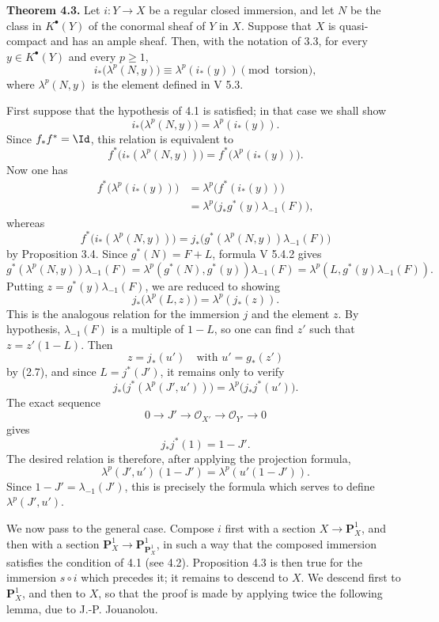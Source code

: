 \documentclass[11pt]{article}
\begin{document}
\textbf{Theorem 4.3.} Let \(i:Y\to X\) be a regular closed immersion, and let \(N\) be the class in \(K^\bullet(Y)\) of the conormal sheaf of \(Y\) in \(X\). Suppose that \(X\) is quasi-compact and has an ample sheaf. Then, with the notation of 3.3, for every \(y\in K^\bullet(Y)\) and every \(p\ge1\),
\begin{equation}\tag{4.3.1}
 i_*\bigl(\lambda^p(N,y)\bigr)\equiv \lambda^p(i_*(y))
 \pmod{\text{torsion}},
\end{equation}
where \(\lambda^p(N,y)\) is the element defined in V 5.3.

First suppose that the hypothesis of 4.1 is satisfied; in that case we shall show
\[
  i_*\bigl(\lambda^p(N,y)\bigr)=\lambda^p(i_*(y)).
\]
Since \(f_*f^*=\Id\), this relation is equivalent to
\[
  f^*\bigl(i_*(\lambda^p(N,y))\bigr)=
  f^*\bigl(\lambda^p(i_*(y))\bigr).
\]
Now one has
\[
\begin{aligned}
 f^*\bigl(\lambda^p(i_*(y))\bigr)
 &=\lambda^p\bigl(f^*(i_*(y))\bigr)\\
 &=\lambda^p\bigl(j_*g^*(y)\lambda_{-1}(F)\bigr),
\end{aligned}
\tag{3.4}
\]
whereas
\[
  f^*\bigl(i_*(\lambda^p(N,y))\bigr)
  =
  j_*\bigl(g^*(\lambda^p(N,y))\lambda_{-1}(F)\bigr)
  \tag{3.4}
\]
by Proposition 3.4. Since \(g^*(N)=F+L\), formula V 5.4.2 gives
\[
  g^*(\lambda^p(N,y))\lambda_{-1}(F)
  =
  \lambda^p(g^*(N),g^*(y))\lambda_{-1}(F)
  =
  \lambda^p(L,g^*(y)\lambda_{-1}(F)).
\]
Putting \(z=g^*(y)\lambda_{-1}(F)\), we are reduced to showing
\[
  j_*\bigl(\lambda^p(L,z)\bigr)=\lambda^p(j_*(z)).
\]
This is the analogous relation for the immersion \(j\) and the element \(z\). By hypothesis, \(\lambda_{-1}(F)\) is a multiple of \(1-L\), so one can find \(z'\) such that \(z=z'(1-L)\). Then
\[
  z=j_*(u')\quad\text{with }u'=g_*(z')
\]
by (2.7), and since \(L=j^*(J')\), it remains only to verify
\[
  j_*\bigl(j^*(\lambda^p(J',u'))\bigr)=
  \lambda^p\bigl(j_*j^*(u')\bigr).
\]
The exact sequence
\[
  0\longrightarrow J'\longrightarrow \mathcal O_{X'}
  \longrightarrow \mathcal O_{Y'}\longrightarrow 0
\]
gives
\begin{equation}\tag{4.3.2}
  j_*j^*(1)=1-J'.
\end{equation}
The desired relation is therefore, after applying the projection formula,
\[
  \lambda^p(J',u')(1-J')=\lambda^p(u'(1-J')).
\]
Since \(1-J'=\lambda_{-1}(J')\), this is precisely the formula which serves to define \(\lambda^p(J',u')\).

We now pass to the general case. Compose \(i\) first with a section \(X\to\mathbf P_X^1\), and then with a section \(\mathbf P_X^1\to\mathbf P_{\mathbf P_X^1}^1\), in such a way that the composed immersion satisfies the condition of 4.1 (see 4.2). Proposition 4.3 is then true for the immersion \(s\circ i\) which precedes it; it remains to descend to \(X\). We descend first to \(\mathbf P_X^1\), and then to \(X\), so that the proof is made by applying twice the following lemma, due to J.-P. Jouanolou.
\end{document}
